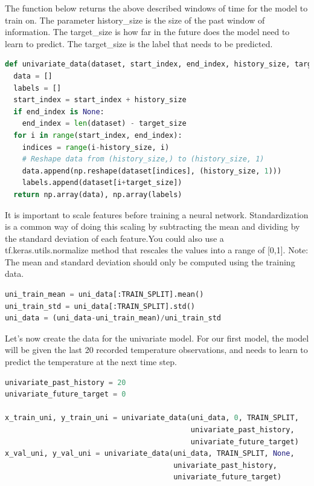 The function below returns the above described windows of time for the model to train on. The parameter history\_size is the size of the past window of information. The target\_size is how far in the future does the model need to learn to predict. The target\_size is the label that needs to be predicted.

\begin{lstlisting}[language=Python, caption= A function to return windows of time followed by history\_size ]
def univariate_data(dataset, start_index, end_index, history_size, target_size):
  data = []
  labels = []
  start_index = start_index + history_size
  if end_index is None:
    end_index = len(dataset) - target_size
  for i in range(start_index, end_index):
    indices = range(i-history_size, i)
    # Reshape data from (history_size,) to (history_size, 1)
    data.append(np.reshape(dataset[indices], (history_size, 1)))
    labels.append(dataset[i+target_size])
  return np.array(data), np.array(labels)
\end{lstlisting}

It is important to scale features before training a neural network. Standardization is a common way of doing this scaling by subtracting the mean and dividing by the standard deviation of each feature.You could also use a tf.keras.utils.normalize method that rescales the values into a range of [0,1]. Note: The mean and standard deviation should only be computed using the training data.

\begin{lstlisting}[language=Python, caption= Scaling the feature by standard method]
uni_train_mean = uni_data[:TRAIN_SPLIT].mean()
uni_train_std = uni_data[:TRAIN_SPLIT].std()
uni_data = (uni_data-uni_train_mean)/uni_train_std
\end{lstlisting}

Let's now create the data for the univariate model. For our first model, the model will be given the last 20 recorded temperature observations, and needs to learn to predict the temperature at the next time step.

\begin{lstlisting}[language=Python, caption= Splitting data into training-set and validation-set]
univariate_past_history = 20
univariate_future_target = 0

x_train_uni, y_train_uni = univariate_data(uni_data, 0, TRAIN_SPLIT,
                                           univariate_past_history,
                                           univariate_future_target)
x_val_uni, y_val_uni = univariate_data(uni_data, TRAIN_SPLIT, None,
                                       univariate_past_history,
                                       univariate_future_target)
\end{lstlisting}

